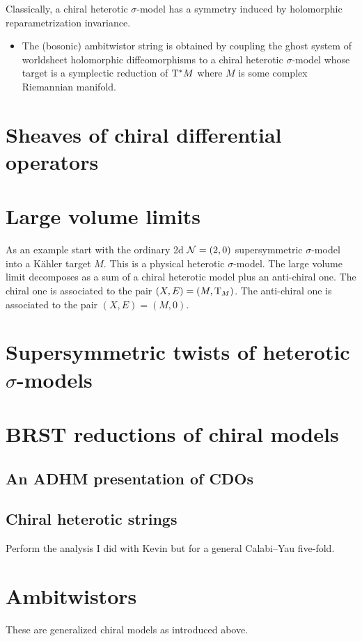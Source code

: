 \documentclass[11pt]{amsart}
\begin{document}
Classically, a chiral heterotic $\sigma$-model has a symmetry induced by holomorphic reparametrization invariance. 

\begin{itemize}
\item 
The (bosonic) ambitwistor string is obtained by coupling the ghost system of worldsheet holomorphic diffeomorphisms to a chiral heterotic $\sigma$-model whose target is a symplectic reduction of ${\rm T}^* M$ where $M$ is some complex Riemannian manifold.
\end{itemize}

\section{Sheaves of chiral differential operators}

\section{Large volume limits}

As an example start with the ordinary 2d $\mathcal N=(2,0)$ supersymmetric $\sigma$-model into a K\"ahler target $M$. 
This is a physical heterotic $\sigma$-model. 
The large volume limit decomposes as a sum of a chiral heterotic model plus an anti-chiral one. 
The chiral one is associated to the pair $(X, E) = (M, {\rm T}_M)$. 
The anti-chiral one is associated to the pair $(X,E) = (M,0)$. 

\section{Supersymmetric twists of heterotic $\sigma$-models} 

\section{BRST reductions of chiral models}

\subsection{An ADHM presentation of CDOs} 

\subsection{Chiral heterotic strings}

Perform the analysis I did with Kevin but for a general Calabi--Yau five-fold. 

\section{Ambitwistors}

These are generalized chiral models as introduced above. 

\printbibliography
\end{document}
